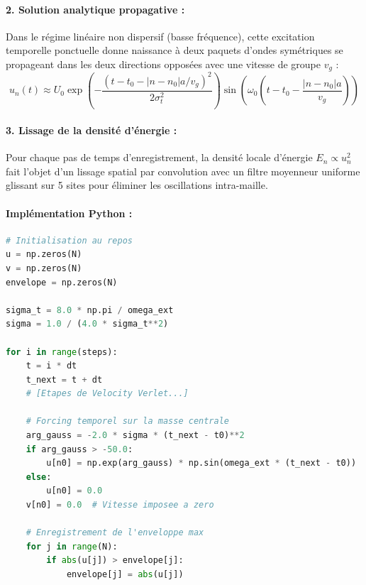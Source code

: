 \paragraph{2. Solution analytique propagative :}
Dans le régime linéaire non dispersif (basse fréquence), cette excitation temporelle ponctuelle donne naissance à deux paquets d'ondes symétriques se propageant dans les deux directions opposées avec une vitesse de groupe $v_g$ :
\begin{equation*}
    u_n(t) \approx U_0 \exp\left(-\frac{(t - t_0 - |n-n_0|a/v_g)^2}{2\sigma_t^2}\right) \sin\left(\omega_0\left(t - t_0 - \frac{|n-n_0|a}{v_g}\right)\right)
\end{equation*}

\paragraph{3. Lissage de la densité d'énergie :}
Pour chaque pas de temps d'enregistrement, la densité locale d'énergie $E_n \propto u_n^2$ fait l'objet d'un lissage spatial par convolution avec un filtre moyenneur uniforme glissant sur 5 sites pour éliminer les oscillations intra-maille.

\paragraph{Implémentation Python :}
\begin{lstlisting}[language=Python, caption={Implémentation du forçage temporel ponctuel}]
# Initialisation au repos
u = np.zeros(N)
v = np.zeros(N)
envelope = np.zeros(N)

sigma_t = 8.0 * np.pi / omega_ext
sigma = 1.0 / (4.0 * sigma_t**2)

for i in range(steps):
    t = i * dt
    t_next = t + dt
    # [Etapes de Velocity Verlet...]
    
    # Forcing temporel sur la masse centrale
    arg_gauss = -2.0 * sigma * (t_next - t0)**2
    if arg_gauss > -50.0:
        u[n0] = np.exp(arg_gauss) * np.sin(omega_ext * (t_next - t0))
    else:
        u[n0] = 0.0
    v[n0] = 0.0  # Vitesse imposee a zero
    
    # Enregistrement de l'enveloppe max
    for j in range(N):
        if abs(u[j]) > envelope[j]: 
            envelope[j] = abs(u[j])
\end{lstlisting}
